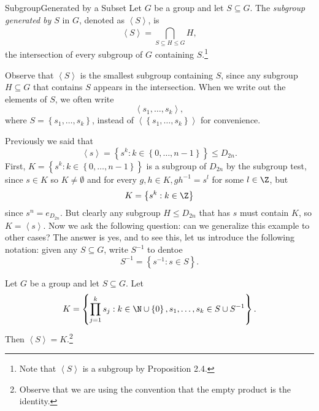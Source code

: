 \documentclass[pmath347]{subfiles}
\begin{document}
    \begin{definition}{Subgroup}{Generated by a Subset}
        Let $G$ be a group and let $S\subseteq G$. The \emph{subgroup generated by $S$} in $G$, denoted as $\left< S \right>$, is
        \begin{equation*}
            \left< S \right> = \bigcap^{}_{S\subseteq H\leq G} H, 
        \end{equation*}
        the intersection of every subgroup of $G$ containing $S$.\footnote{Note that $\left< S \right>$ is a subgroup by Proposition 2.4.}
    \end{definition} 

    Observe that $\left< S \right>$ is the smallest subgroup containing $S$, since any subgroup $H\subseteq G$ that contains $S$ appears in the intersection. When we write out the elements of $S$, we often write
    \begin{equation*}
        \left< s_1,\ldots,s_k \right>  ,
    \end{equation*}
    where $S=\left\lbrace s_1,\ldots,s_k \right\rbrace$, instead of $\left< \left\lbrace s_1,\ldots,s_k \right\rbrace \right>$ for convenience.

    \np Previously we said that
    \begin{equation*}
        \left< s \right> = \left\lbrace s^k: k\in\left\lbrace 0,\ldots,n-1 \right\rbrace  \right\rbrace \leq D_{2n}.
    \end{equation*}
    First, $K = \left\lbrace s^k:k\in\left\lbrace 0,\ldots,n-1 \right\rbrace  \right\rbrace$ is a subgroup of $D_{2n}$ by the subgroup test, since $s\in K$ so $K\neq\emptyset$ and for every $g,h\in K, gh^{-1} = s^{l}$ for some $l\in\Z$, but
    \begin{equation*}
        K = \left\lbrace s^k:k\in\Z \right\rbrace 
    \end{equation*}
    since $s^n=e_{D_{2n}}$. But clearly any subgroup $H\leq D_{2n}$ that has $s$ must contain $K$, so $K = \left< s \right>$. Now we ask the following question: can we generalize this example to other cases? The answer is yes, and to see this, let us introduce the following notation: given any $S\subseteq G$, write $S^{-1} $ to dentoe
    \begin{equation*}
        S^{-1} = \left\lbrace s^{-1} :s\in S \right\rbrace .
    \end{equation*}

    \begin{prop}{}
        Let $G$ be a group and let $S\subseteq G$. Let
        \begin{equation*}
            K = \left\lbrace \prod^{k}_{j=1} s_j: k\in\N\cup\left\lbrace 0 \right\rbrace , s_1,\ldots,s_k\in S\cup S^{-1}  \right\rbrace .
        \end{equation*}
        Then $\left< S \right> = K$.\footnote{Observe that we are using the convention that the empty product is the identity.}
    \end{prop}
\end{document}

